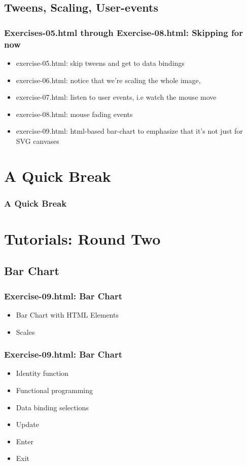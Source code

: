 \documentclass{beamer}
\begin{document}
\subsection{Tweens, Scaling, User-events}

\begin{frame}
    \frametitle{Exercises-05.html through Exercise-08.html: Skipping for now}
    \begin{itemize}
    \item exercise-05.html: skip tweens and get to data bindings
    \item exercise-06.html: notice that we're scaling the whole image,
    \item exercise-07.html: listen to user events, i.e watch the mouse move
    \item exercise-08.html: mouse fading events
    \item exercise-09.html: html-based bar-chart to emphasize that it's not just for SVG canvases
    \end{itemize}
\end{frame}


\section{A Quick Break}

\begin{frame}
    \frametitle{A Quick Break}
\end{frame}


\section{Tutorials: Round Two}


\subsection{Bar Chart}


\begin{frame}
    \frametitle{Exercise-09.html: Bar Chart}
    \begin{itemize}
    \item Bar Chart with HTML Elements
    \item Scales
    \end{itemize}
\end{frame}


\begin{frame}
    \frametitle{Exercise-09.html: Bar Chart}
    \begin{itemize}
    \item Identity function
    \item Functional programming
    \item Data binding selections
    \item Update
    \item Enter
    \item Exit
    \end{itemize}
\end{frame}
\end{document}
